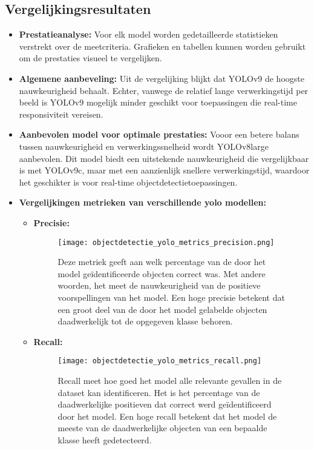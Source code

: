 \subsection{Vergelijkingsresultaten}
\begin{itemize}
\item \textbf{Prestatieanalyse:} Voor elk model worden gedetailleerde statistieken verstrekt over de meetcriteria. Grafieken en tabellen kunnen worden gebruikt om de prestaties visueel te vergelijken.
\item \textbf{Algemene aanbeveling:} Uit de vergelijking blijkt dat YOLOv9 de hoogste nauwkeurigheid behaalt. Echter, vanwege de relatief lange verwerkingstijd per beeld is YOLOv9 mogelijk minder geschikt voor toepassingen die real-time responsiviteit vereisen.
\item \textbf{Aanbevolen model voor optimale prestaties:} Vooor een betere balans tussen nauwkeurigheid en verwerkingssnelheid wordt YOLOv8large aanbevolen. Dit model biedt een uitstekende nauwkeurigheid die vergelijkbaar is met YOLOv9c, maar met een aanzienlijk snellere verwerkingstijd, waardoor het geschikter is voor real-time objectdetectietoepassingen.
\newpage
\item \textbf{Vergelijkingen metrieken van verschillende yolo modellen:}
  \begin{itemize}
    \item \textbf{Precisie:}
    \begin{figure}[H]
      \centering
      \texttt{[image: objectdetectie\_yolo\_metrics\_precision.png]}
      \caption{Deze metriek geeft aan welk percentage van de door het model geïdentificeerde objecten correct was. Met andere woorden, het meet de nauwkeurigheid van de positieve voorspellingen van het model. Een hoge precisie betekent dat een groot deel van de door het model gelabelde objecten daadwerkelijk tot de opgegeven klasse behoren.}
      \label{fig:precisie}
    \end{figure}
    \newpage
    \item \textbf{Recall:}
    \begin{figure}[H]
      \texttt{[image: objectdetectie\_yolo\_metrics\_recall.png]}
      \caption{Recall meet hoe goed het model alle relevante gevallen in de dataset kan identificeren. Het is het percentage van de daadwerkelijke positieven dat correct werd geïdentificeerd door het model. Een hoge recall betekent dat het model de meeste van de daadwerkelijke objecten van een bepaalde klasse heeft gedetecteerd.}

\end{figure}
\end{itemize}
\end{itemize}
